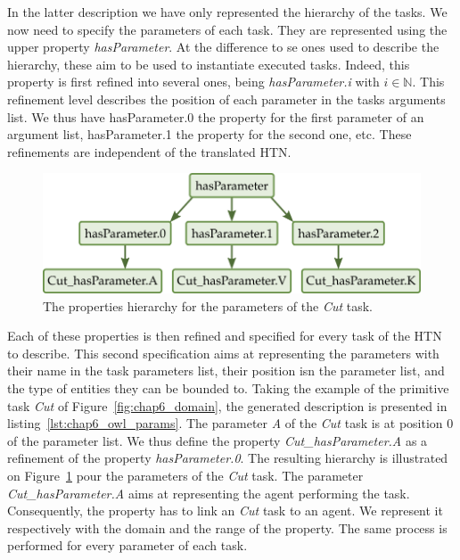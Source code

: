 In the latter description we have only represented the hierarchy of the tasks. We now need to specify the parameters of each task. They are represented using the upper property \textit{hasParameter}. At the difference to se ones used to describe the hierarchy, these aim to be used to instantiate executed tasks. Indeed, this property is first refined into several ones, being \textit{hasParameter.i} with $i \in \mathbb{N}$. This refinement level describes the position of each parameter in the tasks arguments list. We thus have hasParameter.0 the property for the first parameter of an argument list, hasParameter.1 the property for the second one, etc. These refinements are independent of the translated HTN.

\begin{figure}[h!]
\centering
\includegraphics[scale=0.4]{figures/chapter6/rbox_params.png}
\caption{\label{fig:chap6_rbox_params} The properties hierarchy for the parameters of the \textit{Cut} task.}
\end{figure}

Each of these properties is then refined and specified for every task of the HTN to describe. This second specification aims at representing the parameters with their name in the task parameters list, their position isn the parameter list, and the type of entities they can be bounded to. Taking the example of the primitive task \textit{Cut} of Figure~\ref{fig:chap6_domain}, the generated description is presented in listing~\ref{lst:chap6_owl_params}. The parameter \textit{A} of the \textit{Cut} task is at position 0 of the parameter list. We thus define the property \textit{Cut\_hasParameter.A} as a refinement of the property \textit{hasParameter.0}. The resulting hierarchy is illustrated on Figure~\ref{fig:chap6_rbox_params} pour the parameters of the \textit{Cut} task. The parameter \textit{Cut\_hasParameter.A} aims at representing the agent performing the task. Consequently, the property has to link an \textit{Cut} task to an agent. We represent it respectively with the domain and the range of the property. The same process is performed for every parameter of each task.

